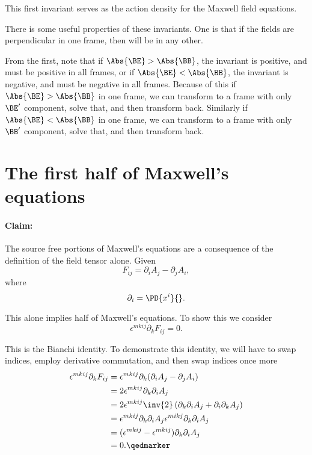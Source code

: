 This first invariant serves as the action density for the Maxwell field equations.

There is some useful properties of these invariants.  One is that if the fields are perpendicular in one frame, then will be in any other.

From the first, note that if \(\Abs{\BE} > \Abs{\BB}\), the invariant is positive, and must be positive in all frames, or if \(\Abs{\BE} < \Abs{\BB}\), the invariant is negative, and must be negative in all frames.  Because of this if \(\Abs{\BE} > \Abs{\BB}\) in one frame, we can transform to a frame with only \(\BE'\) component, solve that, and then transform back.  Similarly if \(\Abs{\BE} < \Abs{\BB}\) in one frame, we can transform to a frame with only \(\BB'\) component, solve that, and then transform back.
%
\section{The first half of Maxwell's equations}
%
\paragraph{Claim: } The source free portions of Maxwell's equations are a consequence of the definition of the field tensor alone.
Given
\begin{equation}\label{eqn:relativisticElectrodynamicsL11:670}
F_{i j} = \partial_i A_j - \partial_j A_i,
\end{equation}
where
\begin{equation}\label{eqn:relativisticElectrodynamicsL11:690}
\partial_i = \PD{x^i}{}.
\end{equation}

This alone implies half of Maxwell's equations.  To show this we consider
%
\begin{equation}\label{eqn:relativisticElectrodynamicsL11:710}
\epsilon^{m k i j} \partial_k F_{i j} = 0.
\end{equation}

This is the Bianchi identity.  To demonstrate this identity, we will have to swap indices, employ derivative commutation, and then swap indices once more
%
\begin{equation}\label{eqn:relativisticElectrodynamicsL11b:1380}
\begin{aligned}
\epsilon^{m k i j} \partial_k F_{i j}
&= \epsilon^{m k i j} \partial_k (\partial_i A_j - \partial_j A_i) \\
&= 2 \epsilon^{m k i j} \partial_k \partial_i A_j \\
&= 2 \epsilon^{m k i j} \inv{2} \left( \partial_k \partial_i A_j + \partial_i \partial_k A_j \right) \\
&=
\epsilon^{m k i j} \partial_k \partial_i A_j
\epsilon^{m i k j} \partial_k \partial_i A_j  \\
&=
(\epsilon^{m k i j} - \epsilon^{m k i j}) \partial_k \partial_i A_j \\
&= 0. \qedmarker
\end{aligned}
\end{equation}

